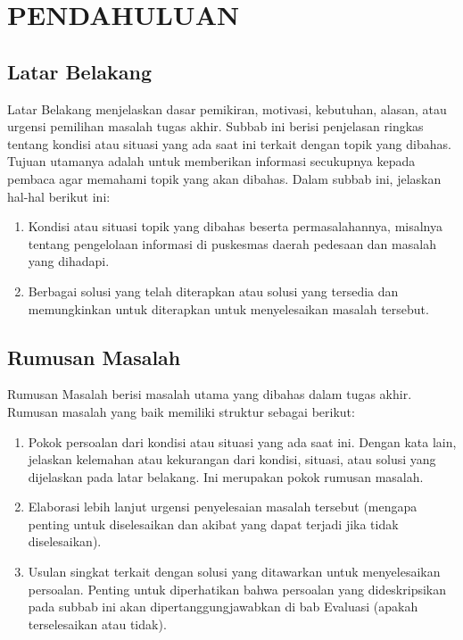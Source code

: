 \documentclass[12pt,a4paper,oneside]{book}
\begin{document}
\captionsetup[figure]{labelsep=space}
\captionsetup[table]{labelsep=space}
\captionsetup[lstlisting]{labelsep=space}

\setlength{\parindent}{0pt}
      
\chapter{PENDAHULUAN}

\section{Latar Belakang}
Latar Belakang menjelaskan dasar pemikiran, motivasi, kebutuhan, alasan, atau urgensi pemilihan masalah tugas akhir. Subbab ini berisi penjelasan ringkas tentang kondisi atau situasi yang ada saat ini terkait dengan topik yang dibahas. Tujuan utamanya adalah untuk memberikan informasi secukupnya kepada pembaca agar memahami topik yang akan dibahas. Dalam subbab ini, jelaskan hal-hal berikut ini:
\begin{enumerate}
\item	Kondisi atau situasi topik yang dibahas beserta permasalahannya, misalnya tentang pengelolaan informasi di puskesmas daerah pedesaan dan masalah yang dihadapi.
\item	Berbagai solusi yang telah diterapkan atau solusi yang tersedia dan memungkinkan untuk diterapkan untuk menyelesaikan masalah tersebut.
\end{enumerate}

\section{Rumusan Masalah}
Rumusan Masalah berisi masalah utama yang dibahas dalam tugas akhir. Rumusan masalah yang baik memiliki struktur sebagai berikut:
\begin{enumerate}
\item	Pokok persoalan dari kondisi atau situasi yang ada saat ini. Dengan kata lain, jelaskan kelemahan atau kekurangan dari kondisi, situasi, atau solusi yang dijelaskan pada latar belakang. Ini merupakan pokok rumusan masalah.
\item	Elaborasi lebih lanjut urgensi penyelesaian masalah tersebut (mengapa penting untuk diselesaikan dan akibat yang dapat terjadi jika tidak diselesaikan).
\item	Usulan singkat terkait dengan solusi yang ditawarkan untuk menyelesaikan persoalan.
Penting untuk diperhatikan bahwa persoalan yang dideskripsikan pada subbab ini akan dipertanggungjawabkan di bab Evaluasi (apakah terselesaikan atau tidak).
\end{enumerate}
\end{document}
